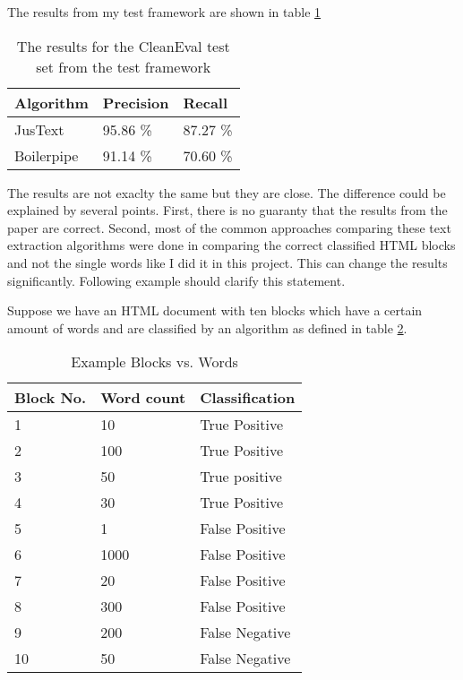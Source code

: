 The results from my test framework are shown in table \ref{table:resultsComparison} 

\begin{table}[!ht]
\begin{tabular}{| p{3cm} | p{3cm} | p{3cm} | }
    \hline
    \textbf{Algorithm}      & \textbf{Precision}  & \textbf{Recall} 				\\ \hline
    JusText     & 95.86 \%       &  87.27 \%		\\ \hline
    Boilerpipe & 91.14 \%       &  70.60 \%		\\ \hline
\end{tabular}
\caption{The results for the CleanEval test set from the test framework}
\label{table:resultsComparison}
\end{table}


The results are not exaclty the same but they are close. The difference could be explained by several points. First, there is no guaranty that the results from the paper are correct. Second, most of the common approaches comparing these text extraction algorithms were done in comparing the correct classified HTML blocks and not the single words like I did it in this project. This can change the results significantly. Following example should clarify this statement.

Suppose we have an HTML document with ten blocks which have a certain amount of words and are classified by an algorithm as defined in table \ref{blockWordExample}.

\begin{table}[!ht]
\begin{tabular}{| p{2cm} | p{3cm} | p{3cm} | }
    \hline
    \textbf{Block No.}      & \textbf{Word count}  & \textbf{Classification} 				\\ \hline
    1     & 10      	&  True Positive	\\ \hline
    2     & 100     	&  True Positive	\\ \hline
    3     & 50       	&  True positive	\\ \hline
    4     & 30       	&  True Positive	\\ \hline
    5     & 1       	&  False Positive	\\ \hline
    6     & 1000      	&  False Positive	\\ \hline
    7     & 20      	&  False Positive	\\ \hline
    8     & 300       	&  False Positive	\\ \hline
    9     & 200       	&  False Negative	\\ \hline
    10    & 50        	&  False Negative	\\ \hline
\end{tabular}
\caption{Example Blocks vs. Words}
\label{blockWordExample}
\end{table}

